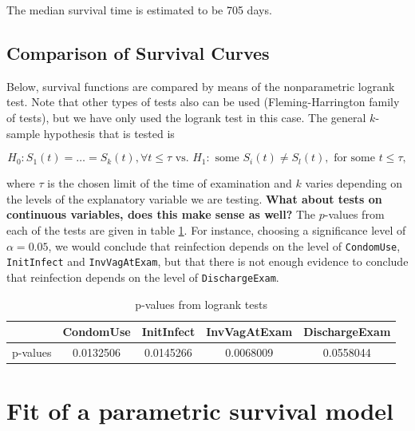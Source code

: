 \documentclass[
]{article}
\begin{document}
The median survival time is estimated to be 705 days.

\hypertarget{comparison-of-survival-curves}{%
\subsection{Comparison of Survival Curves}\label{comparison-of-survival-curves}}

Below, survival functions are compared by means of the nonparametric logrank test. Note that other types of tests also can be used (Fleming-Harrington family of tests), but we have only used the logrank test in this case. The general \(k\)-sample hypothesis that is tested is

\begin{equation*}
        H_0: S_1(t) = \ldots = S_k(t), \forall t \leq \tau \text{ vs. } H_1: \text{ some } S_i(t) \neq S_l(t), \text{ for some } t \leq \tau,
\end{equation*}

where \(\tau\) is the chosen limit of the time of examination and \(k\) varies depending on the levels of the explanatory variable we are testing. \textbf{What about tests on continuous variables, does this make sense as well?} The \(p\)-values from each of the tests are given in table \ref{tab:pvalues}. For instance, choosing a significance level of \(\alpha = 0.05\), we would conclude that reinfection depends on the level of \texttt{CondomUse}, \texttt{InitInfect} and \texttt{InvVagAtExam}, but that there is not enough evidence to conclude that reinfection depends on the level of \texttt{DischargeExam}.

\begin{table}

\caption{\label{tab:pvalues}p-values from logrank tests}
\centering
\begin{tabular}[t]{l|c|c|c|c}
\hline
  & CondomUse & InitInfect & InvVagAtExam & DischargeExam\\
\hline
p-values & 0.0132506 & 0.0145266 & 0.0068009 & 0.0558044\\
\hline
\end{tabular}
\end{table}

\hypertarget{fit-of-a-parametric-survival-model}{%
\section{Fit of a parametric survival model}\label{fit-of-a-parametric-survival-model}}
\end{document}
